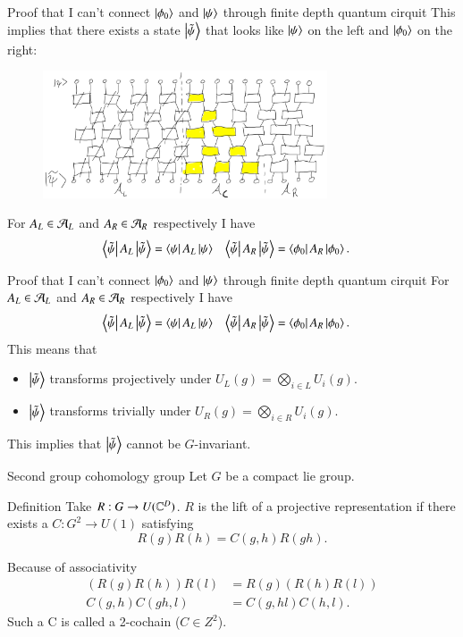 \documentclass{beamer}
\begin{document}
\begin{frame}{Proof that I can't connect $\ket{\phi_0}$ and $\ket{\psi}$ through finite depth quantum cirquit}
	This implies that there exists a state $\ket{\tilde\psi}$ that looks like $\ket{\psi}$ on the left and $\ket{\phi_0}$ on the right:
	\begin{figure}
		\center
		\includegraphics[width=0.75\textwidth]{Figures/ConnectingPsiAndPsi0Proof2_WithLightcone.png}
	\end{figure}
	\pause
	For $A_L\in\AA_L$ and $A_R\in\AA_R$ respectively I have
	\begin{align}
		\bra{\tilde\psi}A_L\ket{\tilde{\psi}}&=\bra{\psi}A_L\ket{\psi}&\bra{\tilde\psi}A_R\ket{\tilde{\psi}}&=\bra{\phi_0}A_R\ket{\phi_0}.
	\end{align}
\end{frame}

\begin{frame}{Proof that I can't connect $\ket{\phi_0}$ and $\ket{\psi}$ through finite depth quantum cirquit}
	For $A_L\in\AA_L$ and $A_R\in\AA_R$ respectively I have
	\begin{align}
		\bra{\tilde\psi}A_L\ket{\tilde{\psi}}&=\bra{\psi}A_L\ket{\psi}&\bra{\tilde\psi}A_R\ket{\tilde{\psi}}&=\bra{\phi_0}A_R\ket{\phi_0}.
	\end{align}
	This means that
	\begin{itemize}
		\item $\ket{\tilde{\psi}}$ transforms projectively under $U_L(g)=\bigotimes_{i \in L}U_i(g)$.
		\item $\ket{\tilde{\psi}}$ transforms trivially under $U_R(g)=\bigotimes_{i \in R}U_i(g)$.
	\end{itemize}
	This implies that $\ket{\tilde{\psi}}$ cannot be $G$-invariant.
\end{frame}

\begin{frame}{Second group cohomology group}
	Let $G$ be a compact lie group.
	\begin{block}{Definition}
		Take $R:G\rightarrow U(\CC^D)$. $R$ is the lift of a projective representation if there exists a $C:G^2\rightarrow U(1)$ satisfying
		\[R(g)R(h)=C(g,h)R(gh).\]
	\end{block}
	\pause
	Because of associativity
	\begin{align*}
		(R(g)R(h))R(l)&=R(g)(R(h)R(l))\\
		C(g,h)C(gh,l)&=C(g,hl)C(h,l).
	\end{align*}
	Such a C is called a 2-cochain ($C\in Z^2$).
\end{frame}
\end{document}
